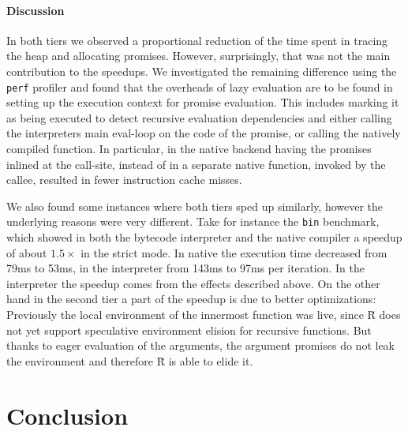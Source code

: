 \documentclass[review,nonacm,screen,acmsmall,anonymous=true]{acmart}
\renewcommand{\Rsh}{{\sf\u R}\xspace}
\begin{document}
\paragraph{Discussion}

In both tiers we observed a proportional reduction of the time spent in tracing
the heap and allocating promises.
However, surprisingly, that was not the main contribution to the speedups.
We investigated the remaining difference using the \lstinline{perf} profiler
and found that the overheads of lazy evaluation are to be found in setting up the
execution context for promise evaluation. This includes marking it as being
executed to detect recursive evaluation dependencies and either calling the interpreters
main eval-loop on the code of the promise, or calling the natively compiled
function. In particular, in the native backend having the promises inlined at the
call-site, instead of in a separate native function, invoked by the callee,
resulted in fewer instruction cache misses.

We also found some instances where both tiers sped up similarly,
however the underlying reasons were very different.
Take for instance the \lstinline{bin} benchmark, which showed in both
the bytecode interpreter and the native compiler a speedup of about $1.5\times$
in the strict mode. In native the execution time decreased from 79ms to 53ms, in
the interpreter from 143ms to 97ms per iteration. In the interpreter the speedup
comes from the effects described above. On the other hand in the second tier
a part of the speedup is due to better optimizations: Previously the local
environment of the innermost function was live, since \Rsh does not yet
support speculative environment elision for recursive functions. But thanks to eager
evaluation of the arguments, the argument promises do not leak the environment
and therefore \Rsh is able to elide it.

\section{Conclusion}\label{sec:conclusion}


\end{document}
